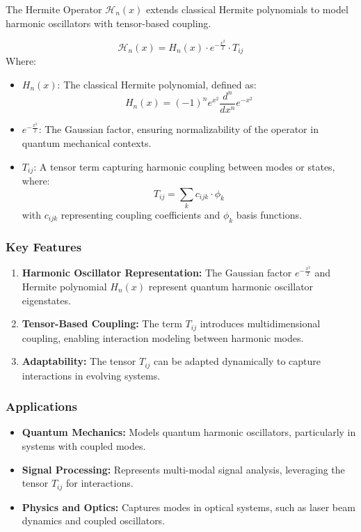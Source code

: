 \documentclass{article}
\theoremstyle{plain}
\begin{document}
The Hermite Operator \( \mathcal{H}_n(x) \) extends classical Hermite polynomials to model harmonic oscillators with tensor-based coupling.

\[
\mathcal{H}_n(x) = H_n(x) \cdot e^{-\frac{x^2}{2}} \cdot T_{ij}
\]
Where:
\begin{itemize}
    \item \( H_n(x) \): The classical Hermite polynomial, defined as:
    \[
    H_n(x) = (-1)^n e^{x^2} \frac{d^n}{dx^n} e^{-x^2}
    \]
    \item \( e^{-\frac{x^2}{2}} \): The Gaussian factor, ensuring normalizability of the operator in quantum mechanical contexts.
    \item \( T_{ij} \): A tensor term capturing harmonic coupling between modes or states, where:
    \[
    T_{ij} = \sum_{k} c_{ijk} \cdot \phi_k
    \]
    with \( c_{ijk} \) representing coupling coefficients and \( \phi_k \) basis functions.
\end{itemize}

\subsubsection*{Key Features}
\begin{enumerate}
    \item \textbf{Harmonic Oscillator Representation:} The Gaussian factor \( e^{-\frac{x^2}{2}} \) and Hermite polynomial \( H_n(x) \) represent quantum harmonic oscillator eigenstates.
    \item \textbf{Tensor-Based Coupling:} The term \( T_{ij} \) introduces multidimensional coupling, enabling interaction modeling between harmonic modes.
    \item \textbf{Adaptability:} The tensor \( T_{ij} \) can be adapted dynamically to capture interactions in evolving systems.
\end{enumerate}

\subsubsection*{Applications}
\begin{itemize}
    \item \textbf{Quantum Mechanics:} Models quantum harmonic oscillators, particularly in systems with coupled modes.
    \item \textbf{Signal Processing:} Represents multi-modal signal analysis, leveraging the tensor \( T_{ij} \) for interactions.
    \item \textbf{Physics and Optics:} Captures modes in optical systems, such as laser beam dynamics and coupled oscillators.
\end{itemize}
\end{document}
